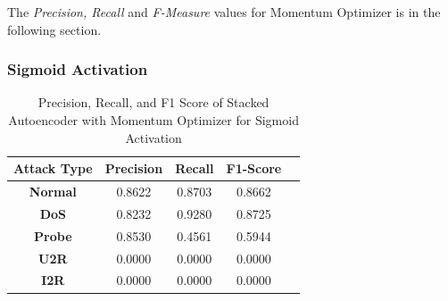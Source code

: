 \documentclass[12pt, a4paper]{report}
\begin{document}
The \textit{Precision, Recall} and \textit{F-Measure} values for Momentum Optimizer is in the following section.\\ \par
\clearpage
\subsubsection{Sigmoid Activation}
\begin{table}[ht]
\centering
\captionsetup{justification=centering,margin=2cm}
\begin{tabular}{|c|c|c|c|c|}
\hline
\multicolumn{1}{|c|}{\textbf{Attack Type}} & \multicolumn{1}{c|}{\textbf{Precision}} & \multicolumn{1}{c|}{\textbf{Recall}} & \multicolumn{1}{c|}{\textbf{F1-Score}} \\ \hline
\textbf{Normal}        & 0.8622                                   & 0.8703                                & 0.8662                                                                  \\ \hline
\textbf{DoS}           & 0.8232                                  & 0.9280                                &  0.8725                                                                    \\ \hline
\textbf{Probe}         & 0.8530                                  & 0.4561                                & 0.5944                                                                  \\ \hline
\textbf{U2R}           & 0.0000                                    & 0.0000                                & 0.0000                                                                   \\ \hline
\textbf{I2R}           & 0.0000                                      & 0.0000                                   & 0.0000                                                            \\ \hline         \end{tabular}
\caption{Precision, Recall, and F1 Score of Stacked Autoencoder with Momentum Optimizer for Sigmoid Activation}
\label{prf1_mom_sigmoid_auto}
\end{table}
\end{document}
